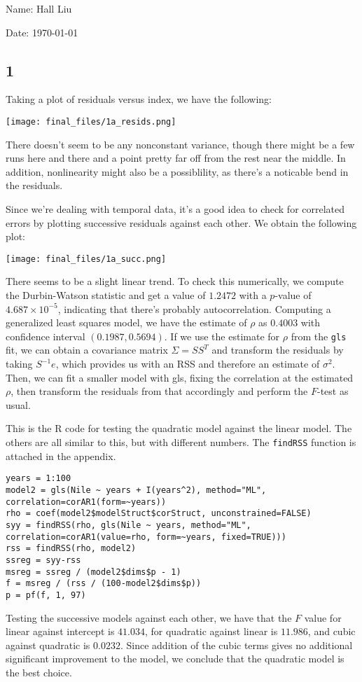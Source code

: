 \documentclass{article}
\begin{document}
Name: Hall Liu

Date: \today 
\vspace{1.5cm}
\subsection*{1}
Taking a plot of residuals versus index, we have the following:

\texttt{[image: final\_files/1a\_resids.png]}

There doesn't seem to be any nonconstant variance, though there might be a few runs here and there and a point pretty far off from the rest near the middle. In addition, nonlinearity might also be a possiblility, as there's a noticable bend in the residuals.

Since we're dealing with temporal data, it's a good idea to check for correlated errors by plotting successive residuals against each other. We obtain the following plot:

\texttt{[image: final\_files/1a\_succ.png]}

There seems to be a slight linear trend. To check this numerically, we compute the Durbin-Watson statistic and get a value of $1.2472$ with a $p$-value of $4.687\times10^{-5}$, indicating that there's probably autocorrelation.
Computing a generalized least squares model, we have the estimate of $\rho$ as $0.4003$ with confidence interval $(0.1987, 0.5694)$.
If we use the estimate for $\rho$ from the \verb|gls| fit, we can obtain a covariance matrix $\Sigma=SS^T$ and transform the residuals by taking $S^{-1}e$, which provides us with an RSS and therefore an estimate of $\sigma^2$. Then, we can fit a smaller model with gls, fixing the correlation at the estimated $\rho$, then transform the residuals from that accordingly and perform the $F$-test as usual.

This is the R code for testing the quadratic model against the linear model. The others are all similar to this, but with different numbers. The \verb|findRSS| function is attached in the appendix.

\begin{verbatim}
years = 1:100
model2 = gls(Nile ~ years + I(years^2), method="ML", correlation=corAR1(form=~years))
rho = coef(model2$modelStruct$corStruct, unconstrained=FALSE)
syy = findRSS(rho, gls(Nile ~ years, method="ML", correlation=corAR1(value=rho, form=~years, fixed=TRUE)))
rss = findRSS(rho, model2)
ssreg = syy-rss
msreg = ssreg / (model2$dims$p - 1)
f = msreg / (rss / (100-model2$dims$p))
p = pf(f, 1, 97)
\end{verbatim}

Testing the successive models against each other, we have that the $F$ value for linear against intercept is $41.034$, for quadratic against linear is $11.986$, and cubic against quadratic is $0.0232$. Since addition of the cubic terms gives no additional significant improvement to the model, we conclude that the quadratic model is the best choice.
\end{document}
